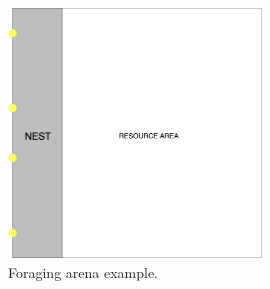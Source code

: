 \documentclass[../../Thesis.tex]{subfiles}
\begin{document}
				\begin{figure}
				    \centering
				    \includegraphics[width=0.6\textwidth]{../../Images/Fault_detection/foraging_arena.png}
				    \caption{Foraging arena example.}
				    \label{fig:foraging_arena_graph}
				\end{figure}
\end{document}
